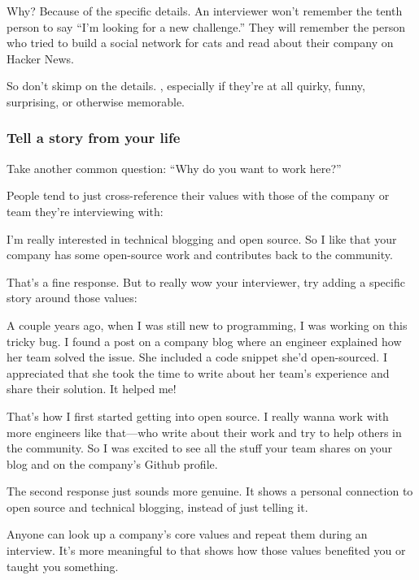 \documentclass{article}
\begin{document}
Why? Because of the specific details. An interviewer won’t remember the tenth person to say “I’m looking for a new challenge.” They will remember the person who tried to build a social network for cats and read about their company on Hacker News.

So don’t skimp on the details. , especially if they’re at all quirky, funny, surprising, or otherwise memorable.


\subsubsection{Tell a story from your life}

Take another common question: “Why do you want to work here?”

People tend to just cross-reference their values with those of the company or team they’re interviewing with:

\begin{tcolorbox}
I’m really interested in technical blogging and open source. So I like that your company has some open-source work and contributes back to the community.  
\end{tcolorbox}


That’s a fine response. But to really wow your interviewer, try adding a specific story around those values:

\begin{tcolorbox}
  A couple years ago, when I was still new to programming, I was working on this tricky bug. I found a post on a company blog where an engineer explained how her team solved the issue. She included a code snippet she’d open-sourced. I appreciated that she took the time to write about her team’s experience and share their solution. It helped me!

  That’s how I first started getting into open source. I really wanna work with more engineers like that—who write about their work and try to help others in the community. So I was excited to see all the stuff your team shares on your blog and on the company’s Github profile.
\end{tcolorbox}



The second response just sounds more genuine. It shows a personal connection to open source and technical blogging, instead of just telling it.

Anyone can look up a company’s core values and repeat them during an interview. It’s more meaningful to  that shows how those values benefited you or taught you something.
\end{document}
